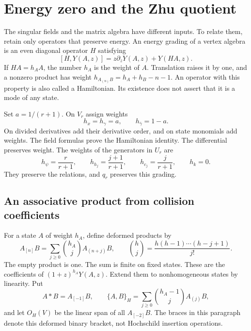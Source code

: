 \section{Energy zero and the Zhu quotient}
\label{sec:sc050-zhu}

The singular fields and the matrix algebra have different inputs.
To relate them, retain only operators that preserve energy.
An energy grading of a vertex algebra is an even diagonal operator
\(H\) satisfying
\[
 [H,Y(A,z)]=z\partial_zY(A,z)+Y(HA,z).
\]
If \(HA=h_AA\), the number \(h_A\) is the weight of \(A\).
Translation raises it by one, and a nonzero product has weight
\(h_{A_{(n)}B}=h_A+h_B-n-1\).
An operator with this property is also called a Hamiltonian.
Its existence does not assert that it is a mode of any state.

Set \(a=1/(r+1)\). On \(V_r\) assign weights
\[
 h_x=h_\gamma=a,\qquad h_{\bar\gamma}=1-a.
\]
On divided derivatives add their derivative order, and on state
monomials add weights. The field formulas prove the Hamiltonian
identity. The differential preserves weight. The weights of the
generators in \(U_r\) are
\[
 h_\psi=\frac r{r+1},\qquad
 h_{h_j}=\frac{j+1}{r+1},\qquad
 h_{c_j}=\frac j{r+1},\qquad h_k=0.
\]
They preserve the relations, and \(q_r\) preserves this grading.

\subsection{An associative product from collision coefficients}

For a state \(A\) of weight \(h_A\), define deformed products by
\[
 A_{[n]}B=\sum_{j\ge0}\binom{h_A}{j}A_{(n+j)}B,\qquad
 \binom{h}{j}=\frac{h(h-1)\cdots(h-j+1)}{j!}.
\]
The empty product is one. The sum is finite on fixed states.
These are the coefficients of \((1+z)^{h_A}Y(A,z)\).
Extend them to nonhomogeneous states by linearity. Put
\[
 A*B=A_{[-1]}B,\qquad
 \{A,B\}_H=\sum_{j\ge0}\binom{h_A-1}{j}A_{(j)}B,
\]
and let \(O_H(V)\) be the linear span of all \(A_{[-2]}B\).
The braces in this paragraph denote this deformed binary bracket,
not Hochschild insertion operations.

